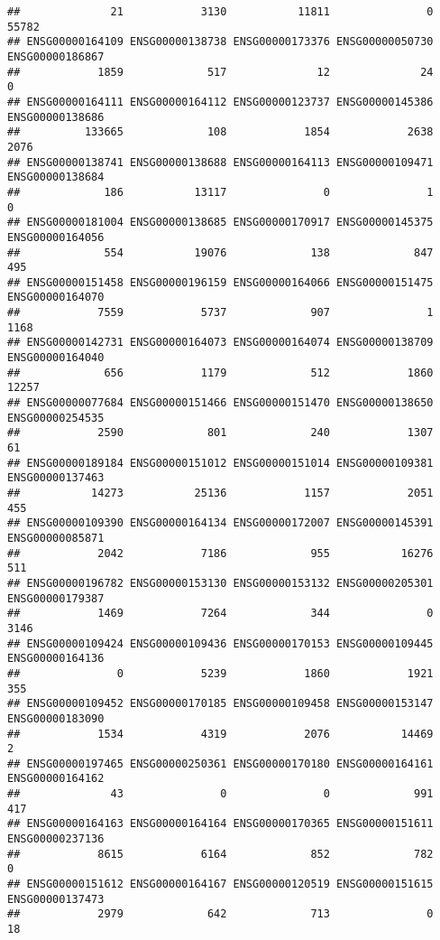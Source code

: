 \documentclass[
]{article}
\begin{document}
\begin{verbatim}
##              21            3130           11811               0           55782 
## ENSG00000164109 ENSG00000138738 ENSG00000173376 ENSG00000050730 ENSG00000186867 
##            1859             517              12              24               0 
## ENSG00000164111 ENSG00000164112 ENSG00000123737 ENSG00000145386 ENSG00000138686 
##          133665             108            1854            2638            2076 
## ENSG00000138741 ENSG00000138688 ENSG00000164113 ENSG00000109471 ENSG00000138684 
##             186           13117               0               1               0 
## ENSG00000181004 ENSG00000138685 ENSG00000170917 ENSG00000145375 ENSG00000164056 
##             554           19076             138             847             495 
## ENSG00000151458 ENSG00000196159 ENSG00000164066 ENSG00000151475 ENSG00000164070 
##            7559            5737             907               1            1168 
## ENSG00000142731 ENSG00000164073 ENSG00000164074 ENSG00000138709 ENSG00000164040 
##             656            1179             512            1860           12257 
## ENSG00000077684 ENSG00000151466 ENSG00000151470 ENSG00000138650 ENSG00000254535 
##            2590             801             240            1307              61 
## ENSG00000189184 ENSG00000151012 ENSG00000151014 ENSG00000109381 ENSG00000137463 
##           14273           25136            1157            2051             455 
## ENSG00000109390 ENSG00000164134 ENSG00000172007 ENSG00000145391 ENSG00000085871 
##            2042            7186             955           16276             511 
## ENSG00000196782 ENSG00000153130 ENSG00000153132 ENSG00000205301 ENSG00000179387 
##            1469            7264             344               0            3146 
## ENSG00000109424 ENSG00000109436 ENSG00000170153 ENSG00000109445 ENSG00000164136 
##               0            5239            1860            1921             355 
## ENSG00000109452 ENSG00000170185 ENSG00000109458 ENSG00000153147 ENSG00000183090 
##            1534            4319            2076           14469               2 
## ENSG00000197465 ENSG00000250361 ENSG00000170180 ENSG00000164161 ENSG00000164162 
##              43               0               0             991             417 
## ENSG00000164163 ENSG00000164164 ENSG00000170365 ENSG00000151611 ENSG00000237136 
##            8615            6164             852             782               0 
## ENSG00000151612 ENSG00000164167 ENSG00000120519 ENSG00000151615 ENSG00000137473 
##            2979             642             713               0              18 

\end{verbatim}
\end{document}
